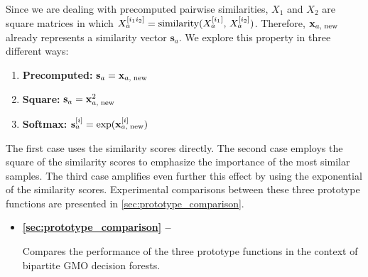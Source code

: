 Since we are dealing with precomputed pairwise similarities, $X_1$ and $X_2$ are square matrices in which $X_a^{[i_1i_2]} = \text{similarity}(X_a^{[i_1]},\, X_a ^{[i_2]})$. Therefore, $\mathbf{x}_{a,\;\text{new}}$ already represents a similarity vector $\mathbf{s}_a$. We explore this property in three different ways:
%
\begin{enumerate}
    \item \textbf{Precomputed:} $\mathbf{s}_a = \mathbf{x}_{a,\;\text{new}}$
    \item \textbf{Square:} $\mathbf{s}_a = \mathbf{x}_{a,\;\text{new}}^2$
    \item \textbf{Softmax:} $\mathbf{s}_a^{[i]} = \exp(\mathbf{x}_{a,\;\text{new}}^{[i]})$
\end{enumerate}
%
The first case uses the similarity scores directly. The second case employs the square of the similarity scores to emphasize the importance of the most similar samples. The third case amplifies even further this effect by using the exponential of the similarity scores.
Experimental comparisons between these three prototype functions are presented in \autoref{sec:prototype_comparison}.

\begin{mdframed}[frametitle={Related experiments}]

   \begin{itemize}
    \item \textbf{\autoref{sec:prototype_comparison} -- }

    Compares the performance of the three prototype functions in the context of bipartite GMO decision forests.

   \end{itemize}
\end{mdframed}


